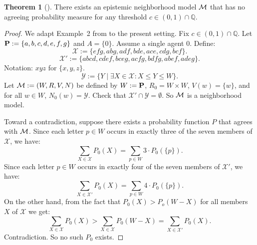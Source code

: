 \documentclass[12pt]{article}
\theoremstyle{definition}
\newtheorem{theorem}{Theorem}[section]
\newcommand{\Rat}{\mathbb{Q}}  %
\newcommand{\M}{{\cal M}}      %
\newcommand{\Prop}{{\bf P}}    %
\begin{document}
\begin{theorem}[\cite{WalleyFine1979:vomacp}]
  \label{theorem:walleyfine}
  There exists an epistemic neighborhood model $\M$ that has no
  agreeing probability measure for any threshold $c\in(0,1)\cap\Rat$.
\end{theorem}
\begin{proof}
  We adapt Example~2 from \cite[pp.~344-345]{WalleyFine1979:vomacp} to
  the present setting.  Fix $c\in(0,1)\cap\Rat$.  Let
  $\Prop:=\{a,b,c,d,e,f,g\}$ and $A=\{0\}$.  Assume a single agent
  $0$.  Define:
\[
   \mathcal{X} := \{efg, abg, adf, bde, ace, cdg, bcf\}. 
\]
\[
   \mathcal{X'} := \{abcd, cdef, bceg, acfg, bdfg, abef, adeg \}. 
\]
Notation:  $xyz$ for $\{x,y,z\}$.
\[
  \mathcal{Y}  := \{ Y \mid \exists X \in  \mathcal{X}: X \leq Y \leq W \}. 
\]
Let $\M:=(W,R,V,N)$ be defined by $W:=\Prop$, $R_0=W\times W$,
$V(w)=\{w\}$, and for all $w \in W$, $N_0(w) = \mathcal{Y}$. 
Check that   $\mathcal{X'} \cap \mathcal{Y} = \emptyset$. 
So $\M$ is a neighborhood model. 

Toward a contradiction, suppose there exists a probability function $P$
that agrees with $\M$. Since each letter $p\in W$ occurs in exactly
three of the seven members of $\mathcal{X}$, we have:
\[
   \sum_{X \in \mathcal{X}} P_0(X) = \sum_{p\in W}3\cdot P_0(\{p\}). 
\]
Since each letter $p\in W$ occurs in exactly four of the seven
members of $\mathcal{X'}$, we have:
\[
\sum_{X \in \mathcal{X'}} P_0(X) = \sum_{p\in W} 4\cdot P_0(\{p\}). 
\]
On the other hand, from the fact that $P_0 (X) > P_o (W-X)$ for all members
$X$ of $\mathcal{X}$ we get: 
\[
   \sum_{X \in \mathcal{X}} P_0 (X) >  
   \sum_{X \in \mathcal{X}} P_0 (W - X) = \sum_{X \in \mathcal{X'}} P_0 (X). 
\]
Contradiction. So no such $P_0$ exists.
\end{proof}

\end{document}
